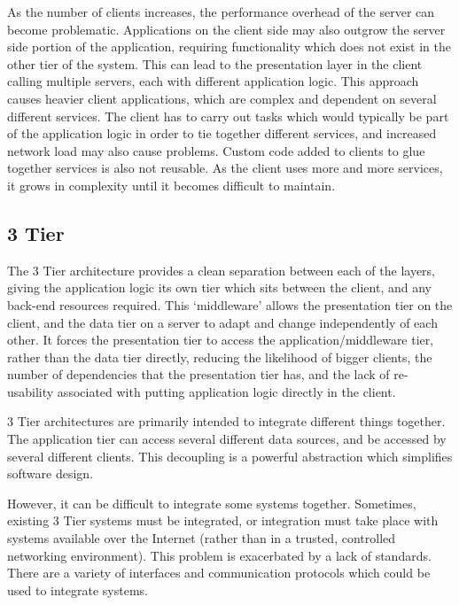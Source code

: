 \documentclass{article}
\begin{document}
As the number of clients increases, the performance overhead of the server can become problematic. Applications on the client side may also outgrow the server side portion of the application, requiring functionality which does not exist in the other tier of the system. This can lead to the presentation layer in the client calling multiple servers, each with different application logic. This approach causes heavier client applications, which are complex and dependent on several different services. The client has to carry out tasks which would typically be part of the application logic in order to tie together different services, and increased network load may also cause problems. Custom code added to clients to glue together services is also not reusable. As the client uses more and more services, it grows in complexity until it becomes difficult to maintain.

\subsection{3 Tier}
The 3 Tier architecture provides a clean separation between each of the layers, giving the application logic its own tier which sits between the client, and any back-end resources required. This `middleware' allows the presentation tier on the client, and the data tier on a server to adapt and change independently of each other. It forces the presentation tier to access the application/middleware tier, rather than the data tier directly, reducing the likelihood of bigger clients, the number of dependencies that the presentation tier has, and the lack of re-usability associated with putting application logic directly in the client. 

3 Tier architectures are primarily intended to integrate different things together. The application tier can access several different data sources, and be accessed by several different clients. This decoupling is a powerful abstraction which simplifies software design.

However, it can be difficult to integrate some systems together. Sometimes, existing 3 Tier systems must be integrated, or integration must take place with systems available over the Internet (rather than in a trusted, controlled networking environment). This problem is exacerbated by a lack of standards. There are a variety of interfaces and communication protocols which could be used to integrate systems.
\end{document}
